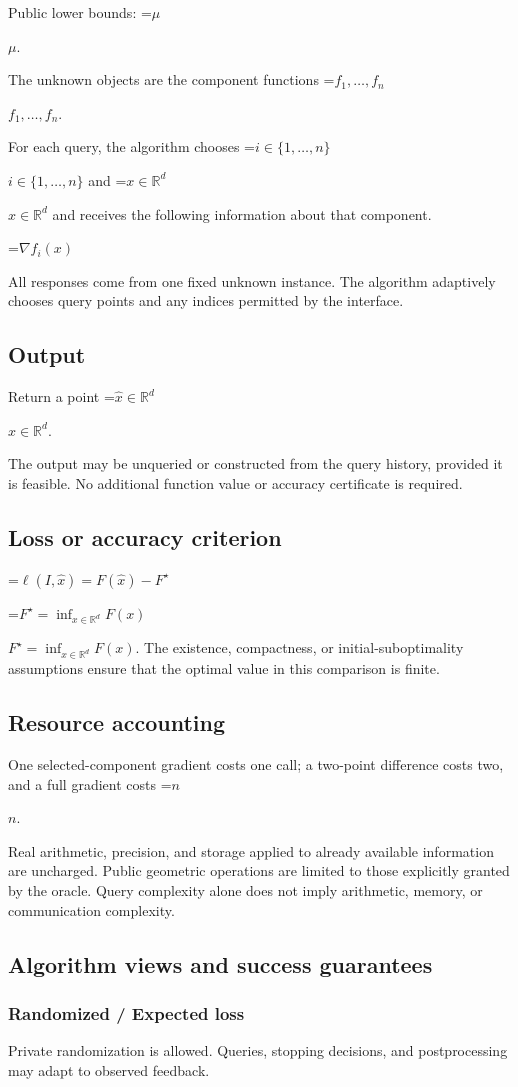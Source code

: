 \documentclass[10pt,a4paper]{article}
\newcommand{\AtlasMath}[1]{\par\begingroup\centering\setbox0=\hbox{$\displaystyle #1$}\ifdim\wd0>1.4\linewidth\typeout{ATLAS WIDE FORMULA: \the\wd0}\fi\ifdim\wd0>\linewidth\resizebox{\linewidth}{!}{\box0}\else\box0\fi\par\endgroup}
\newcommand{\AtlasInlineMath}[1]{\begingroup\setbox0=\hbox{$#1$}\ifdim\wd0>.4\linewidth\endgroup\AtlasMath{#1}\else\endgroup$#1$\fi}
\begin{document}
Public lower bounds: \AtlasInlineMath{\mu}.

The unknown objects are the component functions \AtlasInlineMath{f_1,\ldots,f_n}.

For each query, the algorithm chooses \AtlasInlineMath{i\in\{1,\ldots,n\}} and \AtlasInlineMath{x\in\mathbb R^d} and receives the following information about that component.


\AtlasMath{\nabla f_i(x)}


All responses come from one fixed unknown instance. The algorithm adaptively chooses query points and any indices permitted by the interface.

\subsection{Output}
Return a point \AtlasInlineMath{\widehat x\in\mathbb R^d}.

The output may be unqueried or constructed from the query history, provided it is feasible. No additional function value or accuracy certificate is required.

\subsection{Loss or accuracy criterion}

\AtlasMath{\ell(I,\widehat{x})=F(\widehat{x})-F^\star}


\AtlasInlineMath{F^\star=\inf_{x\in \mathbb{R}^d}F(x)}. The existence, compactness, or initial-suboptimality assumptions ensure that the optimal value in this comparison is finite.

\subsection{Resource accounting}
One selected-component gradient costs one call; a two-point difference costs two, and a full gradient costs \AtlasInlineMath{n}.

Real arithmetic, precision, and storage applied to already available information are uncharged. Public geometric operations are limited to those explicitly granted by the oracle. Query complexity alone does not imply arithmetic, memory, or communication complexity.

\subsection{Algorithm views and success guarantees}
\subsubsection{Randomized / Expected loss}
Private randomization is allowed. Queries, stopping decisions, and postprocessing may adapt to observed feedback.
\end{document}
